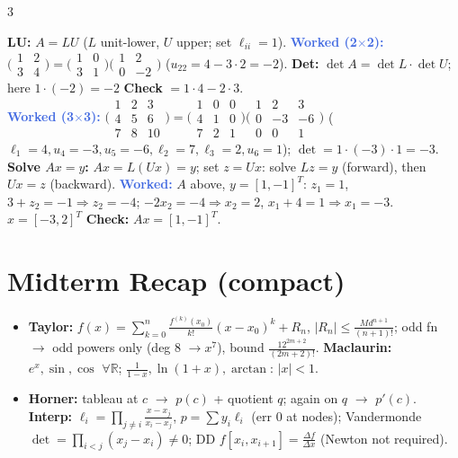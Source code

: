 \documentclass[9pt]{extarticle}
\newcommand{\wk}[1]{\textbf{\textcolor{OliveGreen}{#1}}}
\newcommand{\ex}[1]{\textbf{\textcolor{RoyalBlue}{#1}}}
\begin{document}
\begin{multicols}{3}
\begin{sloppypar}
\textbf{LU:} $A=LU$ ($L$ unit-lower, $U$ upper; set $\ell_{ii}=1$). \ex{Worked (2$\times$2):} $\big(\begin{smallmatrix}1&2\\3&4\end{smallmatrix}\big)=\big(\begin{smallmatrix}1&0\\3&1\end{smallmatrix}\big)\big(\begin{smallmatrix}1&2\\0&-2\end{smallmatrix}\big)$ ($u_{22}=4-3\cdot2=-2$). \textbf{Det:} $\det A=\det L\cdot\det U$; here $1\cdot(-2)=-2$ \wk{Check} $=1\cdot4-2\cdot3$.\\
\ex{Worked (3$\times$3):} $\big(\begin{smallmatrix}1&2&3\\4&5&6\\7&8&10\end{smallmatrix}\big)=\big(\begin{smallmatrix}1&0&0\\4&1&0\\7&2&1\end{smallmatrix}\big)\big(\begin{smallmatrix}1&2&3\\0&-3&-6\\0&0&1\end{smallmatrix}\big)$ ($\ell_1{=}4,u_4{=}-3,u_5{=}-6,\ell_2{=}7,\ell_3{=}2,u_6{=}1$); $\det=1\cdot(-3)\cdot1=-3$.\\
\textbf{Solve $Ax=y$:} $Ax=L(Ux)=y$; set $z=Ux$: solve $Lz=y$ (forward), then $Ux=z$ (backward). \ex{Worked:} $A$ above, $y=[1,-1]^T$: $z_1=1$, $3+z_2=-1\Rightarrow z_2=-4$; $-2x_2=-4\Rightarrow x_2=2$, $x_1+4=1\Rightarrow x_1=-3$. $\boxed{x=[-3,2]^T}$ \wk{Check:} $Ax=[1,-1]^T$.
\end{sloppypar}

\section{Midterm Recap (compact)}
\begin{sloppypar}\raggedright
\begin{itemize}
\item \textbf{Taylor:} $f(x)=\sum_{k=0}^n\tfrac{f^{(k)}(x_0)}{k!}(x-x_0)^k+R_n$, $|R_n|\le\tfrac{Md^{n+1}}{(n+1)!}$; odd fn $\to$ odd powers only (deg 8 $\to x^7$), bound $\tfrac{12^{2m+2}}{(2m+2)!}$. \textbf{Maclaurin:} $e^x,\sin,\cos$ $\forall\mathbb R$; $\tfrac1{1-x},\ln(1{+}x),\arctan$: $|x|<1$.
\item \textbf{Horner:} tableau at $c$ $\to$ $p(c)$ + quotient $q$; again on $q$ $\to$ $p'(c)$. \textbf{Interp:} $\ell_i=\prod_{j\ne i}\tfrac{x-x_j}{x_i-x_j}$, $p=\sum y_i\ell_i$ (err $0$ at nodes); Vandermonde $\det=\prod_{i<j}(x_j-x_i)\ne0$; DD $f[x_i,x_{i+1}]=\tfrac{\Delta f}{\Delta x}$ (Newton not required).
\end{itemize}
\end{sloppypar}


\end{multicols}
\end{document}
